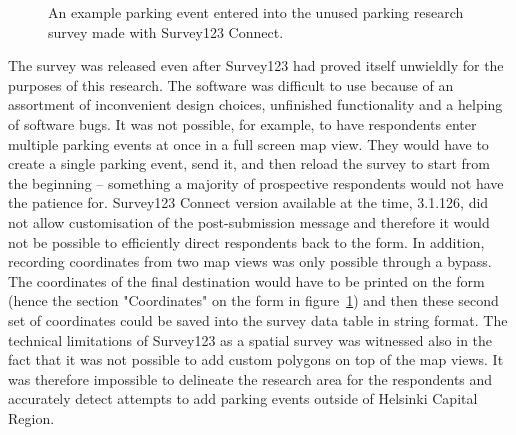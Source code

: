 \begin{figure}[H]%
    \centering
    \caption[The unused parking survey created with Survey123]{An example parking event entered into the unused parking research survey made with Survey123 Connect.}%
    \label{fig:survey123}%
\end{figure}

The survey was released even after Survey123 had proved itself unwieldly for the purposes of this research. The software was difficult to use because of an assortment of inconvenient design choices, unfinished functionality and a helping of software bugs. It was not possible, for example, to have respondents enter multiple parking events at once in a full screen map view. They would have to create a single parking event, send it, and then reload the survey to start from the beginning -- something a majority of prospective respondents would not have the patience for. Survey123 Connect version available at the time, 3.1.126, did not allow customisation of the post-submission message and therefore it would not be possible to efficiently direct respondents back to the form. In addition, recording coordinates from two map views was only possible through a bypass. The coordinates of the final destination would have to be printed on the form (hence the section "Coordinates" on the form in figure~\ref{fig:survey123}) and then these second set of coordinates could be saved into the survey data table in string format. The technical limitations of Survey123 as a spatial survey was witnessed also in the fact that it was not possible to add custom polygons on top of the map views. It was therefore impossible to delineate the research area for the respondents and accurately detect attempts to add parking events outside of Helsinki Capital Region.

